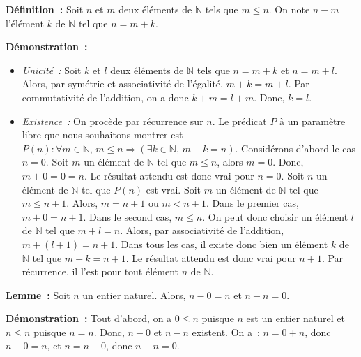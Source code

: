 \medskip

\noindent\textbf{Définition :} Soit $n$ et $m$ deux éléments de $\mathbb{N}$ tels que $m \leq n$. 
    On note $n-m$ l'élément $k$ de $\mathbb{N}$ tel que $n = m  + k$.

\medskip

\noindent\textbf{Démonstration :} 
    \begin{itemize}[nosep]
        \item \textit{Unicité :}
            Soit $k$ et $l$ deux éléments de $\mathbb{N}$ tels que $n = m + k$ et $n = m + l$.
            Alors, par symétrie et associativité de l'égalité, $m + k = m + l$. 
            Par commutativité de l'addition, on a donc $k + m = l + m$.
            Donc, $k = l$.
        \item \textit{Existence :}
            On procède par récurrence sur $n$. 
            Le prédicat $P$ à un paramètre libre que nous souhaitons montrer est $P(n): \forall m \in \mathbb{N}, \, m \leq n \Rightarrow (\exists k \in \mathbb{N}, \, m+k=n)$.
            Considérons d'abord le cas $n=0$. 
            Soit $m$ un élément de $\mathbb{N}$ tel que $m \leq n$, alors $m=0$. 
            Donc, $m+0 = 0 = n$. 
            Le résultat attendu est donc vrai pour $n=0$.
            Soit $n$ un élément de $\mathbb{N}$ tel que $P(n)$ est vrai. 
            Soit $m$ un élément de $\mathbb{N}$ tel que $m \leq n+1$. 
            Alors, $m = n+1$ ou $m < n+1$. 
            Dans le premier cas, $m+0=n+1$. 
            Dans le second cas, $m \leq n$. 
            On peut donc choisir un élément $l$ de $\mathbb{N}$ tel que $m+l=n$. 
            Alors, par associativité de l'addition, $m+(l+1)=n+1$. 
            Dans tous les cas, il existe donc bien un élément $k$ de $\mathbb{N}$ tel que $m+k=n+1$.
            Le résultat attendu est donc vrai pour $n+1$. 
            Par récurrence, il l'est pour tout élément $n$ de $\mathbb{N}$.
    \end{itemize}

   \done 

\medskip

\noindent\textbf{Lemme :} Soit $n$ un entier naturel. Alors, $n - 0 = n$ et $n - n = 0$. 

\medskip

\noindent\textbf{Démonstration :} Tout d'abord, on a $0 \leq n$ puisque $n$ est un entier naturel et $n \leq n$ puisque $n = n$. 
    Donc, $n - 0$ et $n - n$ existent.
    On a : $n = 0 + n$, donc $n - 0 = n$, et $n = n + 0$, donc $n - n = 0$.

